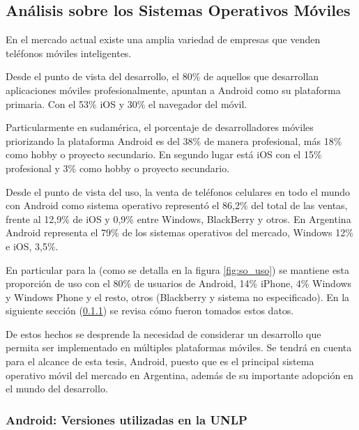 \subsection{Análisis sobre los Sistemas Operativos Móviles}
\label{sistemas_operativos}

En el mercado actual existe una amplia variedad de empresas que venden
teléfonos móviles inteligentes.

Desde el punto de vista del desarrollo, el 80\% de aquellos que desarrollan
aplicaciones móviles profesionalmente, apuntan a Android como su plataforma
primaria. Con el 53\% iOS y 30\% el navegador del móvil\cite{DevNation2}.


Particularmente en sudamérica, el porcentaje de desarrolladores móviles
priorizando la plataforma Android es del 38\% de manera profesional,
más 18\% como hobby o proyecto secundario. En segundo lugar está iOS con el 15\%
profesional y 3\% como hobby o proyecto secundario\cite{DevNation2}.

Desde el punto de vista del uso, la venta de teléfonos celulares en todo el
mundo con Android como sistema operativo representó el 86,2\% del total de las
ventas, frente al 12,9\% de iOS y 0,9\% entre Windows, BlackBerry y otros.
En Argentina Android representa el 79\% de los sistemas operativos del mercado,
Windows 12\% e iOS, 3,5\%\cite{SmartphoneMarketShare}.

En particular para la \unlp{} (como se detalla en la figura \ref{fig:so_uso}) se mantiene esta proporción de uso con el 80\% de usuarios de Android, 14\% iPhone, 4\% Windows y Windows Phone y el resto, otros (Blackberry y sistema no especificado). En la siguiente sección (\ref{sistemas_operativos_versiones}) se revisa cómo fueron tomados estos datos. 


De estos hechos se desprende la necesidad de considerar un desarrollo que permita ser implementado en múltiples plataformas móviles. Se tendrá en cuenta para el alcance de esta tesis, Android, puesto que es el principal sistema operativo móvil del mercado en Argentina\cite{SmartphoneMarketShare}, además de su importante adopción en el mundo del desarrollo\cite{DevNation2}.

\subsubsection{Android: Versiones utilizadas en la UNLP}
\label{sistemas_operativos_versiones}

